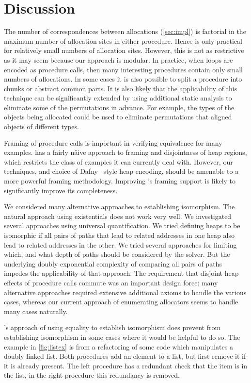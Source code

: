 \documentclass[runningheads,a4paper]{llncs}
\begin{document}
\section{Discussion}\label{sec:discussion}

The number of correspondences between allocations (\cref{sec:impl}) is factorial in the maximum number of allocation sites in either procedure. Hence \metho{} is only practical for relatively small numbers of allocation sites. However, this is not as restrictive as it may seem because our approach is modular. In practice, when loops are encoded as procedure calls, then many interesting procedures contain only small numbers of allocations. In some cases it is also possible to split a procedure into chunks or abstract common parts. It is also likely that the applicability of this technique can be significantly extended by using additional static analysis to eliminate some of the permutations in advance. For example, the types of the objects being allocated could be used to eliminate permutations that aligned objects of different types. 

Framing of procedure calls is important in verifying equivalence for many examples. \Tool{} has a fairly n{\"a}ive approach to framing and disjointness of heap regions, which restricts the class of examples it can currently deal with. However, our techniques, and choice of Dafny~\cite{Leino10} style heap encoding, should be amenable to a more powerful framing methodology. Improving \tool{}'s framing support is likely to significantly improve its completeness.

We considered many alternative approaches to establishing isomorphism. The natural approach using existentials does not work very well. We investigated several approaches using universal quantification. We tried defining heaps to be isomorphic if all pairs of paths that lead to related addresses in one heap also lead to related addresses in the other. We tried several approaches for limiting which, and what depth of paths should be considered by the solver. But the underlying doubly exponential complexity of comparing all pairs of paths impedes the applicability of that approach. The requirement that disjoint heap effects of procedure calls commute was an important design force: many alternative approaches required extensive additional axioms to handle the various cases, whereas our current approach of enumerating allocators seems to handle many cases naturally.

\metho{}'s approach of using equality to establish isomorphism does prevent \tool{} from establishing isomorphism in some cases where it would be helpful to do so. The example in \cref{fig:listex} is from a refactoring of some code which manipulates a doubly linked list. Both procedures add an element to a list, but first remove it if it is already present. The left procedure has a redundant check that the item is in the list, in the right procedure this redundancy is removed.  
\end{document}
